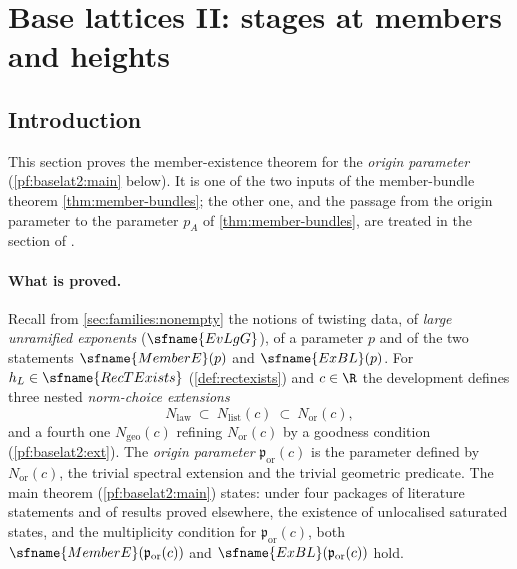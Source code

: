 \section{Base lattices II: stages at members and heights}\label{sec:pf:baselat2}

\providecommand{\bltwoL}[1]{\mathcal{L}_{\mathrm{#1}}}
\providecommand{\bltwoN}[1]{N_{\mathrm{#1}}}
\providecommand{\bltwop}{\mathfrak{p}}
\providecommand{\bltwoSt}{\mathrm{St}}
\providecommand{\bltwoWt}{W_{\mathrm{t}}}
\providecommand{\bltwoOO}{\mathcal{O}}
\providecommand{\bltwoS}[1]{\mathbf{S}_{\mathrm{#1}}}

\subsection{Introduction}\label{sec:pf:baselat2:intro}

This section proves the member-existence theorem for the \emph{origin parameter}
(\cref{pf:baselat2:main} below). It is one of the two inputs of the member-bundle theorem
\cref{thm:member-bundles}; the other one, and the passage from the origin parameter to the parameter
$p_A$ of \cref{thm:member-bundles}, are treated in the section of
.

\paragraph{What is proved.} Recall from \cref{sec:families:nonempty} the notions of twisting data,
of \emph{large unramified exponents} ($\sfname{EvLgG}$), of a parameter $p$ and of the two statements
$\sfname{MemberE}(p)$ and $\sfname{ExBL}(p)$. For $h_L\in\sfname{RecTExists}$ (\cref{def:rectexists}) and
$c\in\R$ the development defines three nested \emph{norm-choice extensions}
\[
  \bltwoN{law}\ \subset\ \bltwoN{list}(c)\ \subset\ \bltwoN{or}(c),
\]
and a fourth one $\bltwoN{geo}(c)$ refining $\bltwoN{or}(c)$ by a goodness condition
(\cref{pf:baselat2:ext}). The \emph{origin parameter} $\bltwop_{\mathrm{or}}(c)$ is the parameter defined by
$\bltwoN{or}(c)$, the trivial spectral extension and the trivial geometric predicate. The main theorem
(\cref{pf:baselat2:main}) states: under four packages of literature statements and of results proved
elsewhere, the existence of unlocalised saturated states, and the multiplicity condition for
$\bltwop_{\mathrm{or}}(c)$, both $\sfname{MemberE}(\bltwop_{\mathrm{or}}(c))$ and $\sfname{ExBL}(\bltwop_{\mathrm{or}}(c))$ hold.

